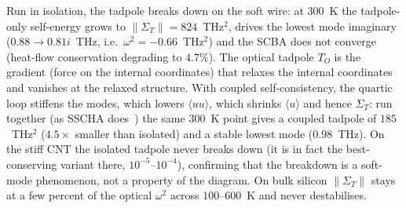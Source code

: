 Run in isolation, the tadpole breaks down on the soft wire: at $300$~K the
tadpole-only self-energy grows to $\|\Sigma_T\|=824$~THz$^2$, drives the
lowest mode imaginary ($0.88\to0.81i$~THz, i.e.\ $\omega^2=-0.66$~THz$^2$)
and the SCBA does not converge (heat-flow conservation degrading to
$4.7\%$). The optical tadpole
$T_O$ is the gradient (force on the internal coordinates) that relaxes the
internal coordinates and vanishes at the relaxed structure.
With coupled self-consistency, the quartic loop
stiffens the modes, which lowers $\langle uu\rangle$, which shrinks
$\langle u\rangle$ and hence $\Sigma_T$: run together
(as SSCHA does~\cite{tadano_first-principles_2018}) the same $300$~K point gives
a coupled tadpole of $185$~THz$^2$ ($4.5\times$ smaller than isolated) and a
stable lowest mode ($0.98$~THz). On the stiff CNT the isolated tadpole
never breaks down (it is in fact the best-conserving variant there,
$10^{-5}$--$10^{-4}$), confirming that the breakdown is a soft-mode
phenomenon, not a property of the diagram. On bulk silicon $\|\Sigma_T\|$
stays at a few percent of the optical $\omega^2$ across $100$--$600$~K and
never destabilises.


